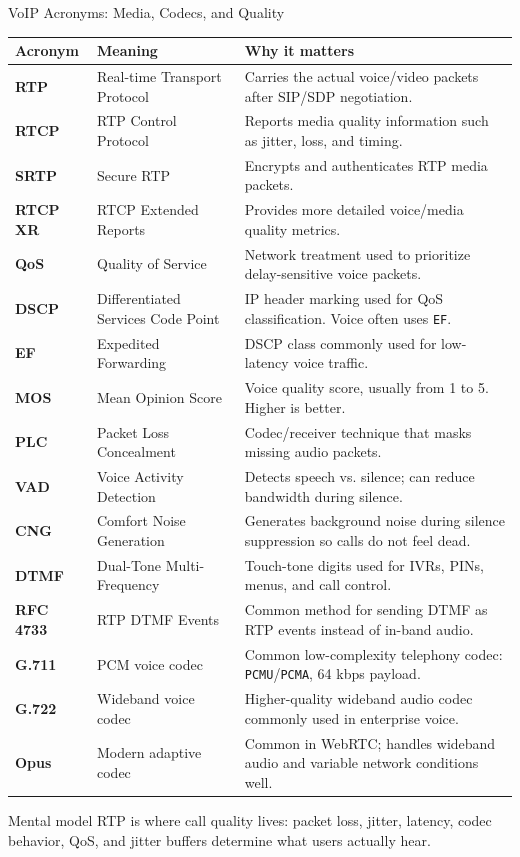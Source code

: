 \documentclass[aspectratio=169]{beamer}
\begin{document}
\begin{frame}{VoIP Acronyms: Media, Codecs, and Quality}
\tiny

\begin{tabular}{p{1.7cm} p{3.3cm} p{7.0cm}}
\toprule
\textbf{Acronym} & \textbf{Meaning} & \textbf{Why it matters} \\
\midrule
\textbf{RTP} & Real-time Transport Protocol & Carries the actual voice/video packets after SIP/SDP negotiation. \\
\textbf{RTCP} & RTP Control Protocol & Reports media quality information such as jitter, loss, and timing. \\
\textbf{SRTP} & Secure RTP & Encrypts and authenticates RTP media packets. \\
\textbf{RTCP XR} & RTCP Extended Reports & Provides more detailed voice/media quality metrics. \\
\textbf{QoS} & Quality of Service & Network treatment used to prioritize delay-sensitive voice packets. \\
\textbf{DSCP} & Differentiated Services Code Point & IP header marking used for QoS classification. Voice often uses \texttt{EF}. \\
\textbf{EF} & Expedited Forwarding & DSCP class commonly used for low-latency voice traffic. \\
\textbf{MOS} & Mean Opinion Score & Voice quality score, usually from 1 to 5. Higher is better. \\
\textbf{PLC} & Packet Loss Concealment & Codec/receiver technique that masks missing audio packets. \\
\textbf{VAD} & Voice Activity Detection & Detects speech vs. silence; can reduce bandwidth during silence. \\
\textbf{CNG} & Comfort Noise Generation & Generates background noise during silence suppression so calls do not feel dead. \\
\textbf{DTMF} & Dual-Tone Multi-Frequency & Touch-tone digits used for IVRs, PINs, menus, and call control. \\
\textbf{RFC 4733} & RTP DTMF Events & Common method for sending DTMF as RTP events instead of in-band audio. \\
\textbf{G.711} & PCM voice codec & Common low-complexity telephony codec: \texttt{PCMU}/\texttt{PCMA}, 64 kbps payload. \\
\textbf{G.722} & Wideband voice codec & Higher-quality wideband audio codec commonly used in enterprise voice. \\
\textbf{Opus} & Modern adaptive codec & Common in WebRTC; handles wideband audio and variable network conditions well. \\
\bottomrule
\end{tabular}

\vspace{0.15cm}

\begin{block}{Mental model}
RTP is where call quality lives: packet loss, jitter, latency, codec behavior, QoS, and jitter buffers determine what users actually hear.
\end{block}

\end{frame}
\end{document}
